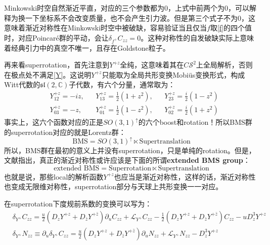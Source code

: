 Minkowski时空自然渐近平直，对应的三个参数都为0，上式中前两个为0，可以解释为换一下坐标系不会改变质量，也不会产生引力波。但是第三个式子不为0，这意味着渐近对称性在Minkowski时空中被破缺，容易验证当且仅当$f$取\ref{f}的四个值时，对应Poincar\'e群的平动，会让$\delta_{f^+} C_{zz}=0$。这种对称性的自发破缺实际上意味着经典引力中的真空不唯一，且存在Goldstone粒子\cite{Strominger:2017zoo}。

再来看superrotation，首先注意到$Y^{+z}$全纯，这意味着其在$C\mathcal{S}^2$上全局解析，否则在极点处不满足\ref{Y}。这说明$Y^{+z}$只能取为全局共形变换Mobi\"us变换形式，构成Witt代数的$\mathfrak{sl}(2,\mathbb{C})$子代数，有六个分量，通常取为：
\begin{align*}
	&Y^{+z}_{12}=-iz,&&Y^{+z}_{13}=\frac{1}{2}(1+z^2),&&Y^{+z}_{23}=\frac{i}{2}(1-z^2)\\
	&Y^{+z}_{03}=-z,&&Y^{+z}_{01}=\frac{1}{2}(1-z^2),&&Y^{+z}_{02}=\frac{i}{2}(1+z^2)
\end{align*}
事实上，这六个函数对应的正是$SO(3,1)^\uparrow$的六个boost和rotation！所以BMS群的superrotation对应的就是Lorentz群：
\begin{equation}
	\text{BMS}=SO(3,1)^\uparrow\ltimes\text{Supertranslation} 
\end{equation}
所以，BMS群在最初的意义上并没有superrotation，只是单纯的rotation。但是，文献\cite{Barnich:2009se,Barnich:2010ojg,Barnich:2011mi,Banks:2003vp}指出，真正的渐近对称性或许应该是下面的所谓\textbf{extended BMS group}：
\begin{equation}
	\text{extended BMS} =\text{Superrotation}\ltimes\text{Supertranslation}
\end{equation}
也就是说，那些local的解析函数$Y^{+z}$也应当是渐近对称性，这样的话，渐近对称性也变成无限维对称性，superrotation部分与天球上共形变换一一对应。

在superrotation下度规前系数的变换可以写为：
\begin{equation}
	\begin{aligned}
		&\delta_{Y^+}C_{zz}=\frac{u}{2}\left(D_zY^{+z}+D_{\bar z}Y^{+\bar z} \right)\partial_u C_{zz}+\mathcal{L}_{Y^+}C_{zz}-\frac{1}{2}\left(D_zY^{+z}+D_{\bar z}Y^{+\bar z}\right)C_{zz}-uD^3_{z}Y^{+z}\\
		&\delta_{Y^+}N_{zz}\equiv\partial_u\delta_{Y^+}C_{zz}=\frac{u}{2}\left(D_zY^{+z}+D_{\bar z}Y^{+\bar z} \right)\partial_u N_{zz}+\mathcal{L}_{Y^+}N_{zz}-D^3_zY^{+z}
	\end{aligned}
\end{equation}


